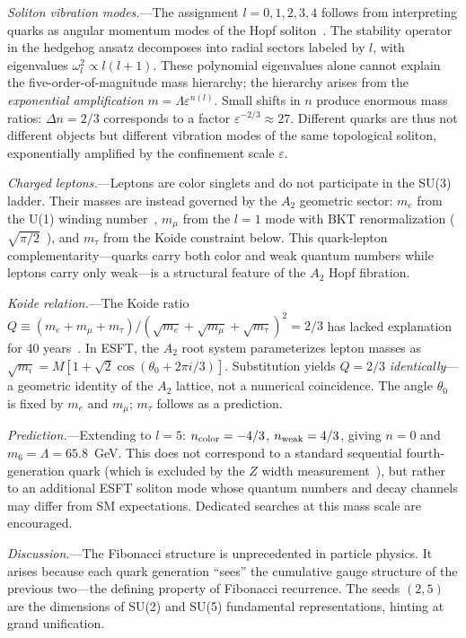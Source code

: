 ﻿\documentclass[twocolumn,showpacs,preprintnumbers,amsmath,amssymb,prl]{revtex4-2}
\begin{document}
\emph{Soliton vibration modes.}---The assignment $l=0,1,2,3,4$ follows from interpreting quarks as angular momentum modes of the Hopf soliton~\cite{Paper1}. The stability operator in the hedgehog ansatz decomposes into radial sectors labeled by $l$, with eigenvalues $\omega_l^2 \propto l(l+1)$. These polynomial eigenvalues alone cannot explain the five-order-of-magnitude mass hierarchy; the hierarchy arises from the \emph{exponential amplification} $m = \Lambda\varepsilon^{n(l)}$. Small shifts in $n$ produce enormous mass ratios: $\Delta n = 2/3$ corresponds to a factor $\varepsilon^{-2/3} \approx 27$. Different quarks are thus not different objects but different vibration modes of the same topological soliton, exponentially amplified by the confinement scale $\varepsilon$.

\emph{Charged leptons.}---Leptons are color singlets and do not participate in the SU(3) ladder. Their masses are instead governed by the $A_2$ geometric sector: $m_e$ from the U(1) winding number~\cite{Paper3}, $m_\mu$ from the $l=1$ mode with BKT renormalization ($\sqrt{\pi/2}$~\cite{Kosterlitz1973,Nelson1977}), and $m_\tau$ from the Koide constraint below. This quark-lepton complementarity---quarks carry both color and weak quantum numbers while leptons carry only weak---is a structural feature of the $A_2$ Hopf fibration.

\emph{Koide relation.}---The Koide ratio $Q \equiv (m_e{+}m_\mu{+}m_\tau)/(\sqrt{m_e}{+}\sqrt{m_\mu}{+}\sqrt{m_\tau})^2 = 2/3$ has lacked explanation for 40 years~\cite{Koide1983}. In ESFT, the $A_2$ root system parameterizes lepton masses as $\sqrt{m_i} = M[1+\sqrt{2}\cos(\theta_0 + 2\pi i/3)]$. Substitution yields $Q = 2/3$ \emph{identically}---a geometric identity of the $A_2$ lattice, not a numerical coincidence. The angle $\theta_0$ is fixed by $m_e$ and $m_\mu$; $m_\tau$ follows as a prediction.

\emph{Prediction.}---Extending to $l=5$: $n_{\rm color} = -4/3$, $n_{\rm weak} = 4/3$, giving $n=0$ and $m_6 = \Lambda = 65.8$~GeV. This does not correspond to a standard sequential fourth-generation quark (which is excluded by the $Z$ width measurement~\cite{PDG2024}), but rather to an additional ESFT soliton mode whose quantum numbers and decay channels may differ from SM expectations. Dedicated searches at this mass scale are encouraged.

\emph{Discussion.}---The Fibonacci structure is unprecedented in particle physics. It arises because each quark generation ``sees'' the cumulative gauge structure of the previous two---the defining property of Fibonacci recurrence. The seeds $(2,5)$ are the dimensions of SU(2) and SU(5) fundamental representations, hinting at grand unification.
\end{document}
